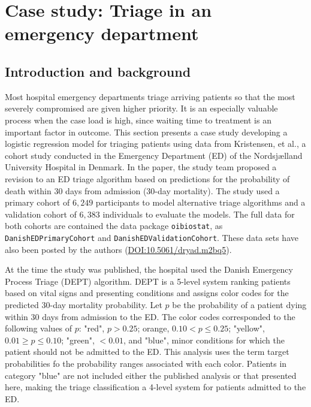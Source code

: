 \section{Case study: Triage in an emergency department}
\label{caseStudy}

\subsection{Introduction and background}
\label{IntroDanishED}

Most hospital emergency departments triage arriving patients so that the most severely compromised  are given higher priority. It is an especially valuable process when the case load is high, since waiting time to treatment is an important factor in outcome.  This section presents a case study developing a logistic regression model for triaging patients using data from Kristensen, et al., a cohort study conducted in the Emergency Department (ED) of the Nordsj{\ae}lland University Hospital in Denmark.  In the paper, the study team proposed a revision to an ED triage algorithm based on predictions for the probability of death within 30 days from admission (30-day mortality).  The study used a primary cohort of $6,249$ participants to model alternative triage algorithms and a validation cohort of $6,383$ individuals to evaluate the models.   The full data for both cohorts are contained the data package \texttt{oibiostat}, as \texttt{DanishEDPrimaryCohort} and \texttt{DanishEDValidationCohort}.  These data sets have also been posted by the authors (\url{DOI:10.5061/dryad.m2bq5}).


At the time the study was published, the hospital used the Danish Emergency Process Triage (DEPT) algorithm.  DEPT is a 5-level system ranking patients based on vital signs and presenting conditions and assigns color codes for the predicted 30-day mortality probability.  Let $p$ be the probability of a patient dying within 30 days from admission to the ED\@.  The color codes corresponded to the following values of $p$: "red", $p > 0.25$; orange, $0.10 < p \leq 0.25$; "yellow",  $0.01 \geq  p  \leq 0.10$; "green",  $ < 0.01$, and "blue", minor conditions for which the patient should not be admitted to the ED\@. This analysis uses the term target probabilities fo the probability ranges associated with each color. Patients in category "blue" are not included either the published analysis or that presented here, making the triage classification a 4-level system for patients admitted to the ED\@.

